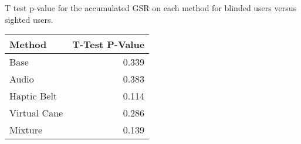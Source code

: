 
\centering
\caption{T test p-value for the accumulated GSR on each method for blinded users versus sighted users.}
\label{tab:ttest_gsr_sum}
\begin{tabular}{lr}
\toprule
      Method &  T-Test P-Value \\
\midrule
        Base &           0.339 \\
       Audio &           0.383 \\
 Haptic Belt &           0.114 \\
Virtual Cane &           0.286 \\
     Mixture &           0.139 \\
\bottomrule
\end{tabular}
